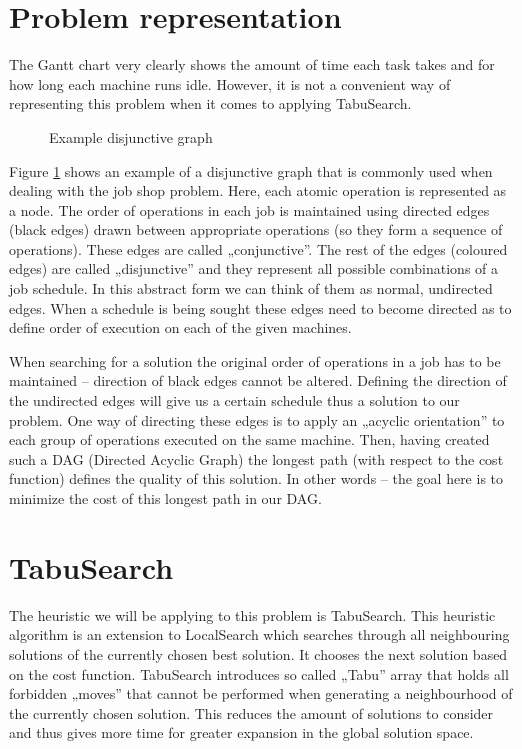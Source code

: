 \documentclass[14pt]{article}
\begin{document}
\section{Problem representation}

The Gantt chart very clearly shows the amount of time each task takes and for how long each machine runs idle. However, it is not a convenient way of representing this problem when it comes to applying TabuSearch.

\begin{figure}[H]
  \centering
  \def\svgwidth{\columnwidth}
  
  \caption{Example disjunctive graph}
  \label{example-disjunctive}
\end{figure}

Figure \ref{example-disjunctive} shows an example of a disjunctive graph that is commonly used when dealing with the job shop problem. Here, each atomic operation is represented as a node. The order of operations in each job is maintained using directed edges (black edges) drawn between appropriate operations (so they form a sequence of operations). These edges are called „conjunctive”. The rest of the edges (coloured edges) are called „disjunctive” and they represent all possible combinations of a job schedule. In this abstract form we can think of them as normal, undirected edges. When a schedule is being sought these edges need to become directed as to define order of execution on each of the given machines.

When searching for a solution the original order of operations in a job has to be maintained – direction of black edges cannot be altered. Defining the direction of the undirected edges will give us a certain schedule thus a solution to our problem. One way of directing these edges is to apply an „acyclic orientation” to each group of operations executed on the same machine. Then, having created such a DAG (Directed Acyclic Graph) the longest path (with respect to the cost function) defines the quality of this solution. In other words – the goal here is to minimize the cost of this longest path in our DAG.

\section{TabuSearch}

The heuristic we will be applying to this problem is TabuSearch. This heuristic algorithm is an extension to LocalSearch which searches through all neighbouring solutions of the currently chosen best solution. It chooses the next solution based on the cost function. TabuSearch introduces so called „Tabu” array that holds all forbidden „moves” that cannot be performed when generating a neighbourhood of the currently chosen solution. This reduces the amount of solutions to consider and thus gives more time for greater expansion in the global solution space.
\end{document}
